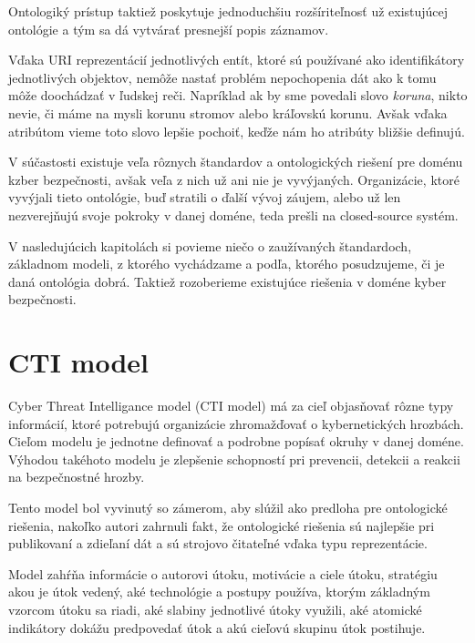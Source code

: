 \documentclass[12pt, a4paper, oneside]{book}
\begin{document}
Ontologiký prístup taktiež poskytuje jednoduchšiu rozšíriteľnosť už existujúcej ontológie a tým sa dá vytvárať presnejší popis záznamov.


Vďaka URI reprezentácií jednotlivých entít, ktoré sú používané ako identifikátory jednotlivých objektov, nemôže nastať problém nepochopenia dát ako k tomu môže doochádzať v ľudskej reči. Napríklad ak by sme povedali slovo \textit{koruna}, nikto nevie, či máme na mysli korunu stromov alebo kráľovskú korunu. Avšak vďaka atribútom vieme toto slovo lepšie pochoiť, keďže nám ho atribúty bližšie definujú.


V súčastosti existuje veľa rôznych štandardov a ontologických riešení pre doménu kzber bezpečnosti, avšak veľa z nich už ani nie je vyvýjaných. Organizácie, ktoré vyvýjali tieto ontológie, buď stratili o ďalší vývoj záujem, alebo už len nezverejňujú svoje pokroky v danej doméne, teda prešli na closed-source systém.


V nasledujúcich kapitolách si povieme niečo o zaužívaných štandardoch, základnom modeli, z ktorého vychádzame a podľa, ktorého posudzujeme, či je daná ontológia dobrá. Taktiež rozoberieme existujúce riešenia v doméne kyber bezpečnosti.

\section{CTI model}
Cyber Threat Intelligance model \citep{MavroeidisB17} (CTI model) má za cieľ objasňovať rôzne typy informácií, ktoré potrebujú organizácie zhromažďovať o kybernetických hrozbách. Cieľom modelu je jednotne definovať a podrobne popísať okruhy v danej doméne. Výhodou takéhoto modelu je zlepšenie schopností pri prevencii, detekcii a reakcii na bezpečnostné hrozby.


Tento model bol vyvinutý so zámerom, aby slúžil ako predloha pre ontologické riešenia, nakoľko autori zahrnuli fakt, že ontologické riešenia sú najlepšie pri publikovaní a zdieľaní dát a sú strojovo čitateľné vďaka typu reprezentácie.


Model zahŕňa informácie o autorovi útoku, motivácie a ciele útoku, stratégiu akou je útok vedený, aké technológie a postupy používa, ktorým základným vzorcom útoku sa riadi, aké slabiny jednotlivé útoky využili, aké atomické indikátory dokážu predpovedať útok a akú cieľovú skupinu útok postihuje.
\end{document}

